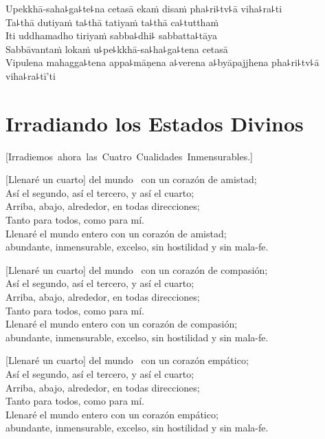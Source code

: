 Upekkhā-saha꜕ga꜕te꜕na cetasā ekaṁ disaṁ pha꜕ri꜕tv꜕ā viha꜕ra꜕ti\\
Ta꜕thā dutiyaṁ ta꜕thā tatiyaṁ ta꜕thā ca꜕tutthaṁ\\
Iti uddhamadho tiriyaṁ sabba꜕dhi꜕ sabbatta꜕tāya\\
Sabbāvantaṁ lokaṁ u꜕pe꜕kkhā-sa꜕ha꜕ga꜕tena cetasā\\
Vipulena mahagga꜕tena appa꜕māṇena a꜕verena a꜕byāpajjhena pha꜕ri꜕tv꜕ā viha꜕ra꜕tī'ti

\chapter*[Irradiando los Estados  Divinos]{Irradiando los Estados Divinos}

\enlargethispage{\baselineskip}


\begin{leader}
  \vspace*{-\baselineskip}
  \mbox{[Irradiemos ahora las Cuatro Cualidades Inmensurables.]}
\end{leader}

[Llenaré un cuarto] del mundo \pause\ con un corazón de amistad;\\
Así el segundo, así el tercero, y así el cuarto;\\
Arriba, abajo, alrededor, en todas direcciones;\\
Tanto para todos, como para mí.\\
Llenaré el mundo entero con un corazón de amistad;\\ abundante, inmensurable, excelso, sin hostilidad y sin mala-fe.

[Llenaré un cuarto] del mundo \pause\ con un corazón de compasión;\\
Así el segundo, así el tercero, y así el cuarto;\\
Arriba, abajo, alrededor, en todas direcciones;\\
Tanto para todos, como para mí.\\
Llenaré el mundo entero con un corazón de compasión;\\ abundante, inmensurable, excelso, sin hostilidad y sin mala-fe.

[Llenaré un cuarto] del mundo \pause\ con un corazón empático;\\
Así el segundo, así el tercero, y así el cuarto;\\
Arriba, abajo, alrededor, en todas direcciones;\\
Tanto para todos, como para mí.\\
Llenaré el mundo entero con un corazón empático;\\ abundante, inmensurable, excelso, sin hostilidad y sin mala-fe.

